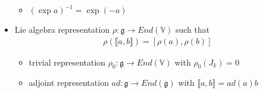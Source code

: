 \documentclass[11pt]{article}
\begin{document}
\begin{itemize}
\begin{itemize}
                \item $(\exp a)^{-1} = \exp (-a) $
            \end{itemize}
        \item Lie algebra representation $\rho: \mathfrak{g} \to End(\mathbb{V})$ such that 
        \begin{align*}
            \rho(\llbracket a,b \rrbracket) = [\rho(a), \rho(b)]
        \end{align*}
            \begin{itemize}
                \item trivial representation $\rho_0: \mathfrak{g} \to End(\mathbb{V})$ with $\rho_0 (J_k) = 0$
                \item adjoint representation $ad: \mathfrak{g} \to End(\mathfrak{g})$ with $\llbracket a,b \rrbracket = ad(a)b$ 
            \end{itemize}
\end{itemize}
\end{document}
